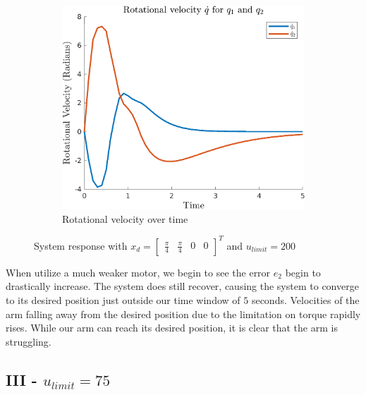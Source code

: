 \documentclass{article}
\begin{document}
\begin{figure}[H]
\begin{subfigure}{0.325\textwidth}
    \end{subfigure}
    \begin{subfigure}{0.325\textwidth}
        \centering
        \includegraphics[width = \textwidth]{figures/rotational-velocity-d2.png}
        \caption{Rotational velocity over time}
    \end{subfigure}
    \caption{System response with $x_d=\begin{bmatrix} \frac{\pi}{4} & \frac{\pi}{4} & 0 & 0 \end{bmatrix}^T$ and $u_{limit} = 200$}
    \label{fig:d-2_results}
\end{figure}

When utilize a much weaker motor, we begin to see the error $e_2$ begin to drastically increase. The system does still recover, causing the system to converge to its desired position just outside our time window of $5$ seconds. Velocities of the arm falling away from the desired position due to the limitation on torque rapidly rises. While our arm can reach its desired position, it is clear that the arm is struggling.

\subsection*{III - $u_{limit} = 75$}
\end{document}
